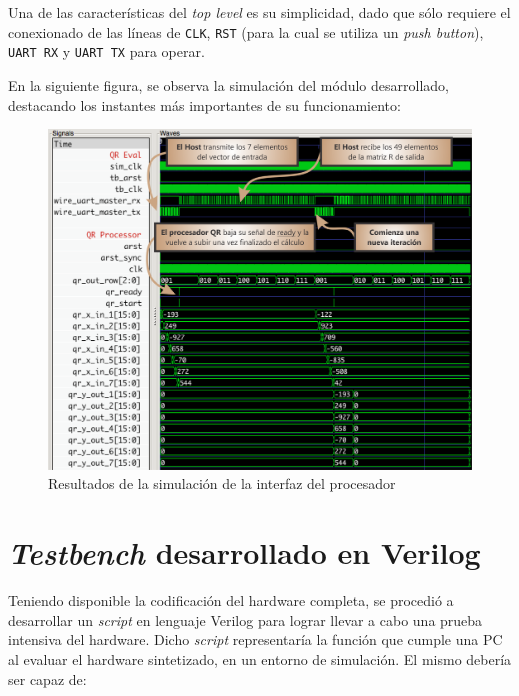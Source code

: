 Una de las características del \textit{top level} es su simplicidad, dado que sólo requiere el conexionado de las líneas de \verb;CLK;, \verb;RST; (para la cual se utiliza un \textit{push button}), \verb;UART RX; y \verb;UART TX; para operar.

\newpage

En la siguiente figura, se observa la simulación del módulo desarrollado, destacando los instantes más importantes de su funcionamiento: 

\begin{figure}[!h]
  \begin{center}
    \includegraphics[width=\textwidth]{./figures/C05-qr_eval_wave}
    \caption{Resultados de la simulación de la interfaz del procesador}
    \label{fig:qr_eval_wave}
  \end{center}
\end{figure}

\section{\textit{Testbench} desarrollado en Verilog}

Teniendo disponible la codificación del hardware completa, se procedió a desarrollar un \textit{script} en lenguaje Verilog para lograr llevar a cabo una prueba intensiva del hardware. Dicho \textit{script} representaría la función que cumple una PC al evaluar el hardware sintetizado, en un entorno de simulación. El mismo debería ser capaz de:

